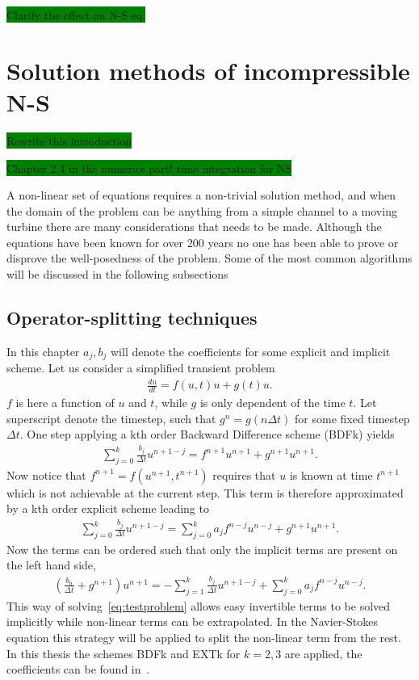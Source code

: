 \colorbox{green}{Clarify the effect on N-S eq.}

\section{Solution methods of incompressible N-S}
\colorbox{green}{Rewrite this introduction}

\colorbox{green}{Chapter 2.4 in the numerics part! time integration for NS}


A non-linear set of equations requires a non-trivial solution method, and when the domain of the problem can be anything from a simple channel 
to a moving turbine there are many considerations that needs to be made. Although the equations have been known for over 200 years no one 
has been able to prove or disprove the well-posedness of the problem. Some of the most common algorithms 
will be discussed in the following subsections

\subsection{Operator-splitting techniques }
In this chapter $a_j,b_j$ will denote the coefficients for some explicit and implicit scheme.
Let us consider a simplified transient problem 
\begin{align}
    \frac{du}{dt} = f(u,t)u + g(t)u.
    \label{eq:testproblem}
\end{align}
$f$ is here a function of $u$ and $t$, while $g$ is only dependent of the time $t$. Let superscript denote the timestep, 
such that $g^{n}=g(n\Delta t)$ for some fixed timestep $\Delta t$. One step applying a kth order
Backward Difference scheme (BDFk) yields
%
\begin{align}
    \sum_{j = 0}^{k} \frac{b_j}{\Delta t} u^{n+1-j} =f^{n+1}u^{n+1}+g^{n+1}u^{n+1}.
    \label{eq:imp}
\end{align}
%
Now notice that $f^{n+1}=f(u^{n+1},t^{n+1})$ requires that $u$ is known at time $t^{n+1}$ which is not achievable at the current 
step. This term is therefore approximated by a kth order explicit scheme leading to 
%
\begin{align}
    \sum_{j = 0}^{k} \frac{b_j}{\Delta t} u^{n+1-j} =\sum_{j = 0}^{k} a_j f^{n-j}u^{n-j}+g^{n+1}u^{n+1}.
    \label{eq:imp-exp}
\end{align}
%
Now the terms can be ordered such that only the implicit terms are present on the left hand side, 
%
\begin{align}
    (\frac{b_0}{\Delta t} +g^{n+1})u^{n+1} =-\sum_{j = 1}^{k} \frac{b_j}{\Delta t} u^{n+1-j}+\sum_{j = 0}^{k} a_j f^{n-j}u^{n-j}.
    \label{eq:imp-exp-ord}
\end{align}
%
This way of solving~\ref{eq:testproblem} allows easy invertible terms to be solved implicitly while non-linear terms can be extrapolated.
In the Navier-Stokes equation this strategy will be applied to split the non-linear term from the rest.
In this thesis the schemes BDFk and EXTk for $k=2,3$ are applied, the coefficients can be found in~\cite{Nek}. 

